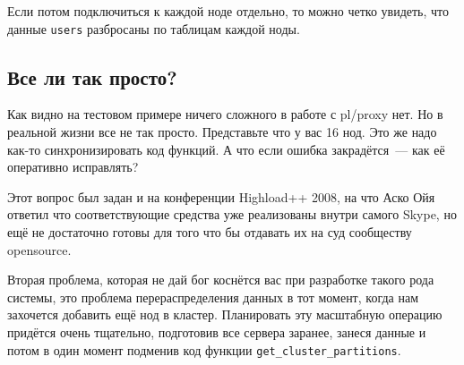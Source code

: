 Если потом подключиться к каждой ноде отдельно, то можно четко увидеть, что данные \lstinline!users! разбросаны по таблицам каждой ноды.


\subsection{Все ли так просто?}


Как видно на тестовом примере ничего сложного в работе с pl/proxy нет. Но в реальной жизни все не так просто. Представьте что у вас 16 нод. Это же надо как-то синхронизировать код функций. А что если ошибка закрадётся~--- как её оперативно исправлять?

Этот вопрос был задан и на конференции Highload++ 2008, на что Аско Ойя ответил что соответствующие средства уже реализованы внутри самого Skype, но ещё не достаточно готовы для того что бы отдавать их на суд сообществу opensource.

Вторая проблема, которая не дай бог коснётся вас при разработке такого рода системы, это проблема перераспределения данных в тот момент, когда нам захочется добавить ещё нод в кластер. Планировать эту масштабную операцию придётся очень тщательно, подготовив все сервера заранее, занеся данные и потом в один момент подменив код функции \lstinline!get_cluster_partitions!.
